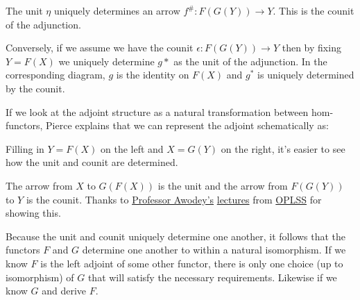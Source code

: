 \documentclass{article}
\begin{document}
\begin{enumerate}
\begin{center}
  \end{center}
\subitem
  The unit $\eta$ uniquely determines an arrow $f^{\#} : F(G(Y)) \rightarrow Y$.
  This is the counit of the adjunction. %

\subitem
  Conversely, if we assume we have the counit $\epsilon : F(G(Y)) \rightarrow Y$ then by fixing $Y = F(X)$ we uniquely determine $g*$ as the unit of the adjunction.
  In the corresponding diagram, $g$ is the identity on $F(X)$ and $g^*$ is uniquely determined by the counit.

\subitem
  If we look at the adjoint structure as a natural transformation between hom-functors, Pierce explains that we can represent the adjoint schematically as:
  \begin{mathpar}
  \end{mathpar}
  Filling in $Y = F(X)$ on the left and $X = G(Y)$ on the right, it's easier to see how the unit and counit are determined.
  \begin{mathpar}
  \end{mathpar}
  \begin{mathpar}
  \end{mathpar}
\subitem
  The arrow from $X$ to $G(F(X))$ is the unit and the arrow from $F(G(Y))$ to $Y$ is the counit.
  Thanks to \href{http://www.andrew.cmu.edu/user/awodey/}{Professor Awodey's} \href{http://www.youtube.com/watch?v=r0YOAeDJ9tU&index=10&list=PLGCr8P_YncjVjwAxrifKgcQYtbZ3zuPlb}{lectures} from \href{https://www.cs.uoregon.edu/research/summerschool/summer14/}{OPLSS} for showing this.

\subitem
  Because the unit and counit uniquely determine one another, it follows that the functors $F$ and $G$ determine one another to within a natural isomorphism.
  If we know $F$ is the left adjoint of some other functor, there is only one choice (up to isomorphism) of $G$ that will satisfy the necessary requirements.
  Likewise if we know $G$ and derive $F$.

\end{enumerate}
\end{document}
